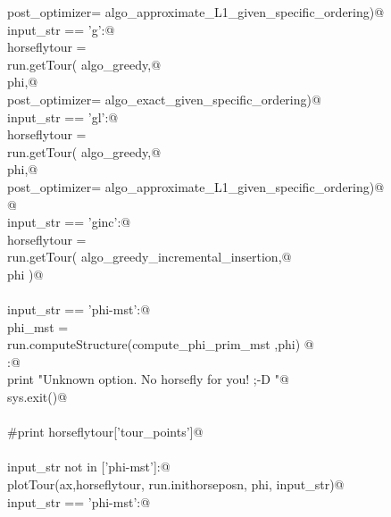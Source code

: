 \documentclass[11.5pt]{report}
\begin{document}
\begin{flushleft}
\begin{list}{}{}
\mbox{}\verb@                          post_optimizer= algo_approximate_L1_given_specific_ordering)@\\
\mbox{}\verb@elif input_str == 'g':@\\
\mbox{}\verb@      horseflytour = \@\\
\mbox{}\verb@             run.getTour( algo_greedy,@\\
\mbox{}\verb@                          phi,@\\
\mbox{}\verb@                          post_optimizer= algo_exact_given_specific_ordering)@\\
\mbox{}\verb@elif input_str == 'gl':@\\
\mbox{}\verb@      horseflytour = \@\\
\mbox{}\verb@             run.getTour( algo_greedy,@\\
\mbox{}\verb@                          phi,@\\
\mbox{}\verb@                          post_optimizer= algo_approximate_L1_given_specific_ordering)@\\
\mbox{}\verb@                          @\\
\mbox{}\verb@elif input_str == 'ginc':@\\
\mbox{}\verb@      horseflytour = \@\\
\mbox{}\verb@             run.getTour( algo_greedy_incremental_insertion,@\\
\mbox{}\verb@                          phi )@\\
\mbox{}\verb@@\\
\mbox{}\verb@elif input_str == 'phi-mst':@\\
\mbox{}\verb@      phi_mst = \@\\
\mbox{}\verb@             run.computeStructure(compute_phi_prim_mst ,phi)     @\\
\mbox{}\verb@else:@\\
\mbox{}\verb@      print "Unknown option. No horsefly for you! ;-D "@\\
\mbox{}\verb@      sys.exit()@\\
\mbox{}\verb@@\\
\mbox{}\verb@#print horseflytour['tour_points']@\\
\mbox{}\verb@@\\
\mbox{}\verb@if input_str not in ['phi-mst']:@\\
\mbox{}\verb@     plotTour(ax,horseflytour, run.inithorseposn, phi, input_str)@\\
\mbox{}\verb@elif input_str == 'phi-mst':@\\

\end{list}
\end{flushleft}
\end{document}
